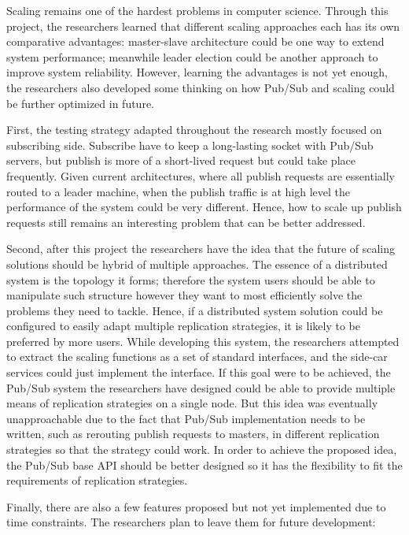 Scaling remains one of the hardest problems in computer science. Through this project, the researchers learned that different scaling approaches each has its own comparative advantages: master-slave architecture could be one way to extend system performance; meanwhile leader election could be another approach to improve system reliability. However, learning the advantages is not yet enough, the researchers also developed some thinking on how Pub/Sub and scaling could be further optimized in future.

First, the testing strategy adapted throughout the research mostly focused on subscribing side. Subscribe have to keep a long-lasting socket with Pub/Sub servers, but publish is more of a short-lived request but could take place frequently. Given current architectures, where all publish requests are essentially routed to a leader machine, when the publish traffic is at high level the performance of the system could be very different. Hence, how to scale up publish requests still remains an interesting problem that can be better addressed.

Second, after this project the researchers have the idea that the future of scaling solutions should be hybrid of multiple approaches. The essence of a distributed system is the topology it forms; therefore the system users should be able to manipulate such structure however they want to most efficiently solve the problems they need to tackle. Hence, if a distributed system solution could be configured to easily adapt multiple replication strategies, it is likely to be preferred by more users. While developing this system, the researchers attempted to extract the scaling functions as a set of standard interfaces, and the side-car services could just implement the interface. If this goal were to be achieved, the Pub/Sub system the researchers have designed could be able to provide multiple means of replication strategies on a single node. But this idea was eventually unapproachable due to the fact that Pub/Sub implementation needs to be written, such as rerouting publish requests to masters, in different replication strategies so that the strategy could work. In order to achieve the proposed idea, the Pub/Sub base API should be better designed so it has the flexibility to fit the requirements of replication strategies.

Finally, there are also a few features proposed but not yet implemented due to time constraints. The researchers plan to leave them for future development:


